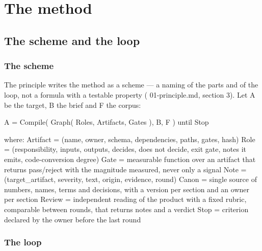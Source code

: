\documentclass[
  american,
  10pt,
]{report}
\newenvironment{Shaded}{\begin{snugshade}}{\end{snugshade}}
\newcommand{\NormalTok}[1]{#1}
\renewenvironment{Shaded}{%
  \def\FrameCommand{{\color{rulecolor}\vrule width 2pt}\hspace{6pt}\colorbox{shadecolor}}%
  \MakeFramed{\advance\hsize-\width\FrameRestore}\small}%
  {\endMakeFramed}
\renewcommand{\texttt}[1]{{\ttfamily\hyphenchar\font=-1 #1}}
\begin{document}
\part{The method}

\chapter{The scheme and the loop}\label{the-scheme-and-the-loop}

\section{The scheme}\label{the-scheme}

The principle writes the method as a scheme --- a naming of the parts
and of the loop, not a formula with a testable property
(\texttt{01-\allowbreak{}principle.\allowbreak{}md}, section 3). Let
\texttt{A} be the target, \texttt{B} the brief and \texttt{F} the
corpus:

\begin{Shaded}
\begin{Highlighting}[]
\NormalTok{A = Compile( Graph( Roles, Artifacts, Gates ), B, F )  until  Stop}

\NormalTok{where:}
\NormalTok{  Artifact   = (name, owner, schema, dependencies, paths, gates, hash)}
\NormalTok{  Role       = (responsibility, inputs, outputs, decides, does not decide,}
\NormalTok{                exit gate, notes it emits, code{-}conversion degree)}
\NormalTok{  Gate       = measurable function over an artifact that returns pass/reject}
\NormalTok{               with the magnitude measured, never only a signal}
\NormalTok{  Note       = (target\_artifact, severity, text, origin, evidence, round)}
\NormalTok{  Canon      = single source of numbers, names, terms and decisions, with a}
\NormalTok{                version per section and an owner per section}
\NormalTok{  Review     = independent reading of the product with a fixed rubric,}
\NormalTok{               comparable between rounds, that returns notes and a verdict}
\NormalTok{  Stop       = criterion declared by the owner before the last round}
\end{Highlighting}
\end{Shaded}

\section{The loop}\label{the-loop}
\end{document}
